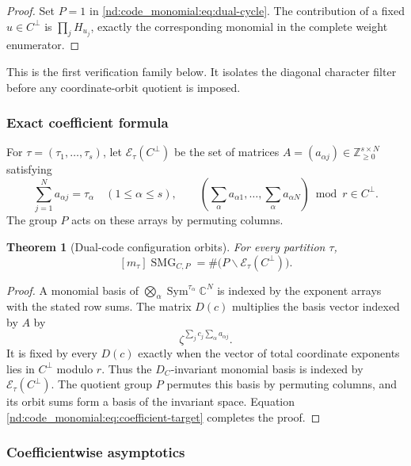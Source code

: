 \documentclass[10pt]{article}
\newcommand{\Sym}{\operatorname{Sym}}
\newcommand{\SMG}{\operatorname{SMG}}
\newcommand{\MGF}{\SMG}
\newcommand{\C}{\mathbb C}
\newcommand{\Z}{\mathbb Z}
\newtheorem{theorem}{Theorem}
\begin{document}
\begin{proof}
Set $P=1$ in \eqref{nd:code_monomial:eq:dual-cycle}.  The contribution of a fixed
$u\in C^\perp$ is $\prod_jH_{u_j}$, exactly the corresponding monomial in
the complete weight enumerator.
\end{proof}

This is the first verification family below.  It isolates the diagonal
character filter before any coordinate-orbit quotient is imposed.

\subsubsection{Exact coefficient formula}

For $\tau=(\tau_1,\ldots,\tau_s)$, let $\mathcal E_\tau(C^\perp)$ be the
set of matrices $A=(a_{\alpha j})\in\Z_{\geq0}^{s\times N}$ satisfying
\[
 \sum_{j=1}^N a_{\alpha j}=\tau_\alpha\quad(1\leq\alpha\leq s),
 \qquad
 \left(\sum_\alpha a_{\alpha1},\ldots,
       \sum_\alpha a_{\alpha N}\right)\bmod r\in C^\perp.
\]
The group $P$ acts on these arrays by permuting columns.

\begin{theorem}[Dual-code configuration orbits]\label{nd:code_monomial:thm:orbits}
For every partition $\tau$,
\begin{equation}\label{nd:code_monomial:eq:orbit-count}
 \boxed{[m_\tau]\MGF_{C,P}
 =\#\bigl(P\backslash\mathcal E_\tau(C^\perp)\bigr).}
\end{equation}
\end{theorem}

\begin{proof}
A monomial basis of
$\bigotimes_\alpha\Sym^{\tau_\alpha}\C^N$ is indexed by the exponent
arrays with the stated row sums.  The matrix $D(c)$ multiplies the basis
vector indexed by $A$ by
\[
 \zeta^{\sum_jc_j\sum_\alpha a_{\alpha j}}.
\]
It is fixed by every $D(c)$ exactly when the vector of total coordinate
exponents lies in $C^\perp$ modulo $r$.  Thus the $D_C$-invariant monomial
basis is indexed by $\mathcal E_\tau(C^\perp)$.  The quotient group $P$
permutes this basis by permuting columns, and its orbit sums form a basis of
the invariant space.  Equation \eqref{nd:code_monomial:eq:coefficient-target} completes the
proof.
\end{proof}

\subsubsection{Coefficientwise asymptotics}
\end{document}
